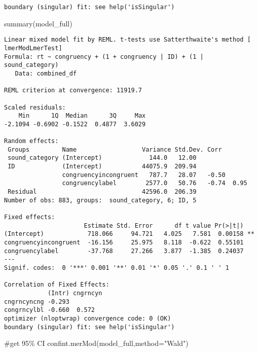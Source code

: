 \documentclass[
  letterpaper,
  DIV=11,
  numbers=noendperiod]{scrartcl}
\newenvironment{Shaded}{\begin{snugshade}}{\end{snugshade}}
\newcommand{\AttributeTok}[1]{\textcolor[rgb]{0.40,0.45,0.13}{#1}}
\newcommand{\CommentTok}[1]{\textcolor[rgb]{0.37,0.37,0.37}{#1}}
\newcommand{\FunctionTok}[1]{\textcolor[rgb]{0.28,0.35,0.67}{#1}}
\newcommand{\NormalTok}[1]{\textcolor[rgb]{0.00,0.23,0.31}{#1}}
\newcommand{\StringTok}[1]{\textcolor[rgb]{0.13,0.47,0.30}{#1}}
\begin{document}
\begin{verbatim}
boundary (singular) fit: see help('isSingular')
\end{verbatim}

\begin{Shaded}
\begin{Highlighting}[]
\FunctionTok{summary}\NormalTok{(model\_full)}
\end{Highlighting}
\end{Shaded}

\begin{verbatim}
Linear mixed model fit by REML. t-tests use Satterthwaite's method [
lmerModLmerTest]
Formula: rt ~ congruency + (1 + congruency | ID) + (1 | sound_category)
   Data: combined_df

REML criterion at convergence: 11919.7

Scaled residuals: 
    Min      1Q  Median      3Q     Max 
-2.1094 -0.6902 -0.1522  0.4877  3.6029 

Random effects:
 Groups         Name                  Variance Std.Dev. Corr       
 sound_category (Intercept)             144.0   12.00              
 ID             (Intercept)           44075.9  209.94              
                congruencyincongruent   787.7   28.07   -0.50      
                congruencylabel        2577.0   50.76   -0.74  0.95
 Residual                             42596.0  206.39              
Number of obs: 883, groups:  sound_category, 6; ID, 5

Fixed effects:
                      Estimate Std. Error      df t value Pr(>|t|)   
(Intercept)            718.066     94.721   4.025   7.581  0.00158 **
congruencyincongruent  -16.156     25.975   8.118  -0.622  0.55101   
congruencylabel        -37.768     27.266   3.877  -1.385  0.24037   
---
Signif. codes:  0 '***' 0.001 '**' 0.01 '*' 0.05 '.' 0.1 ' ' 1

Correlation of Fixed Effects:
            (Intr) cngrncyn
cngrncyncng -0.293         
congrncylbl -0.660  0.572  
optimizer (nloptwrap) convergence code: 0 (OK)
boundary (singular) fit: see help('isSingular')
\end{verbatim}

\begin{Shaded}
\begin{Highlighting}[]
\CommentTok{\#get 95\% CI}
\FunctionTok{confint.merMod}\NormalTok{(model\_full,}\AttributeTok{method=}\StringTok{"Wald"}\NormalTok{)}
\end{Highlighting}
\end{Shaded}
\end{document}
